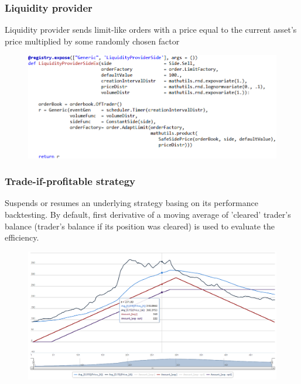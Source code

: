 \documentclass{beamer}
\begin{document}
\begin{frame}
\frametitle{Liquidity provider}
Liquidity provider sends limit-like orders with a price equal to the current asset's price multiplied by some randomly chosen factor
\begin{figure}[htbp]
\centering
\includegraphics[width=1\linewidth]{liquidityprovider.png}
\end{figure}
\end{frame}

\begin{frame}
\frametitle{Trade-if-profitable strategy}
Suspends or resumes an underlying strategy basing on its performance backtesting. By default, first derivative of a moving average of 'cleared' trader's balance (trader's balance if its position was cleared) is used to evaluate the efficiency.
\begin{figure}[htbp]
\centering
\includegraphics[width=1\linewidth]{tradeifprofitable.png}
\end{figure}
\end{frame}
\end{document}
